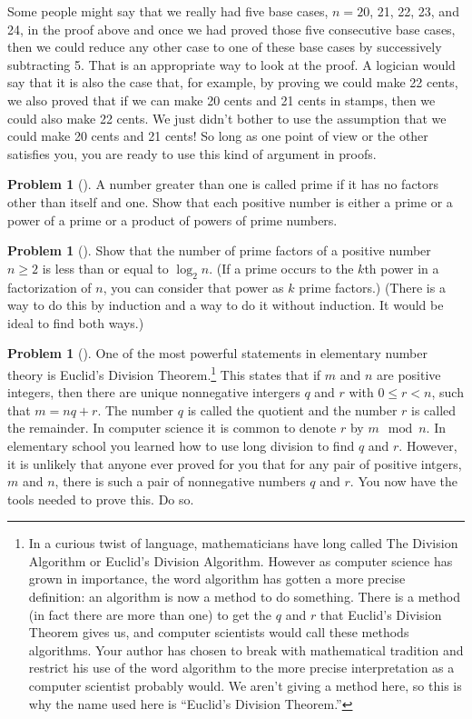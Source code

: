 \documentclass[10pt,]{book}
\theoremstyle{plain}
\theoremstyle{definition}
\newtheorem{activity}[project]{Problem}
\theoremstyle{definition}
\numberwithin{equation}{chapter}
\newcommand{\lt}{<}
\begin{document}
\par
Some people might say that we really had five base cases, \(n=20\), 21, 22, 23, and 24, in the proof above and once we had proved those five consecutive base cases, then we could reduce any other case to one of these base cases by successively subtracting 5. That is an appropriate way to look at the proof. A logician would say that it is also the case that, for example, by proving we could make 22 cents, we also proved that if we can make 20 cents and 21 cents in stamps, then we could also make 22 cents. We just didn't bother to use the assumption that we could make 20 cents and 21 cents! So long as one point of view or the other satisfies you, you are ready to use this kind of argument in proofs.%
\begin{activity}[]\marginsymbol[-1em]{} \label{activity-368}
A number greater than one is called prime if it has no factors other than itself and one. Show that each positive number is either a prime or a power of a prime or a product of powers of prime numbers.%
\end{activity}
\begin{activity}[]\marginsymbol[-1em]{} \label{activity-369}
Show that the number of prime factors of a positive number \(n\ge 2\) is less than or equal to \(\log_2 n\).  (If a prime occurs to the \(k\)th power in a factorization of \(n\), you can consider that power as \(k\) prime factors.)  (There is a way to do this by induction and a way to do it without induction.  It would be ideal to find both ways.)%
\end{activity}
\begin{activity}[]\marginsymbol[-1em]{} \label{euclidsdivthm}
One of the most powerful statements in elementary number theory is Euclid's Division Theorem.\footnote{In a curious twist of language, mathematicians have long called The Division Algorithm or Euclid's Division Algorithm. However as computer science has grown in importance, the word algorithm has gotten a more precise definition: an algorithm is now a method to do something. There is a method (in fact there are more than one) to get the \(q\) and \(r\) that Euclid's Division Theorem gives us, and computer scientists would call these methods algorithms. Your author has chosen to break with mathematical tradition and restrict his use of the word algorithm to the more precise interpretation as a computer scientist probably would. We aren't giving a method here, so this is why the name used here is ``Euclid's Division Theorem.''\label{fn-25}} This states that if \(m\) and \(n\) are positive integers, then there are unique nonnegative intergers \(q\) and \(r\) with \(0 \le r \lt n\), such that \(m = nq + r\). The number \(q\) is called the quotient and the number \(r\) is called the remainder. In computer science it is common to denote \(r\) by \(m \mod n\). In elementary school you learned how to use long division to find \(q\) and \(r\). However, it is unlikely that anyone ever proved for you that for any pair of positive intgers, \(m\) and \(n\), there is such a pair of nonnegative numbers \(q\) and \(r\). You now have the tools needed to prove this. Do so.%
\end{activity}
\end{document}
